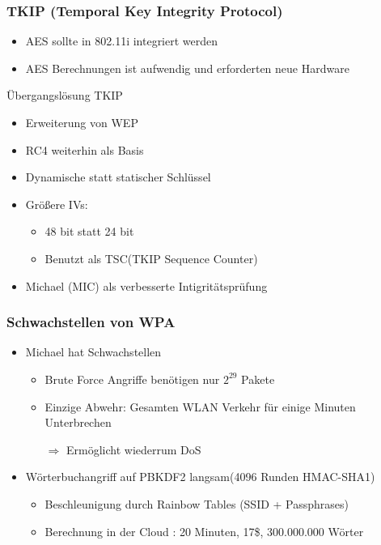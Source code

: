 \documentclass{beamer}
\begin{document}
\begin{frame}
\frametitle{TKIP (Temporal Key Integrity Protocol)}
\begin{itemize}
	\item AES sollte in 802.11i integriert werden
	\item AES Berechnungen ist aufwendig und erforderten neue Hardware
\end{itemize}
\begin{block}{Übergangslösung TKIP}
	\begin{itemize}
		\item Erweiterung von WEP
		\item RC4 weiterhin als Basis
		\item Dynamische statt statischer Schlüssel
		\item Größere IVs:
		\begin{itemize}
			\item 48 bit statt 24 bit
			\item Benutzt als TSC(TKIP Sequence Counter)
		\end{itemize}
		\item Michael (MIC) als verbesserte Intigritätsprüfung
	\end{itemize}
\end{block}
\end{frame}

\begin{frame}
\frametitle{Schwachstellen von WPA}
\begin{itemize}
	\item Michael hat Schwachstellen
	\begin{itemize}
		\item Brute Force Angriffe benötigen nur $2^{29}$ Pakete
		\item Einzige Abwehr: Gesamten WLAN Verkehr für einige Minuten Unterbrechen
		\item[$\Rightarrow$] Ermöglicht wiederrum DoS
	\end{itemize}
	\item Wörterbuchangriff auf PBKDF2 langsam(4096 Runden HMAC-SHA1)
	\begin{itemize}
		\item Beschleunigung durch Rainbow Tables \cite{renderlab} (SSID + Passphrases)
		\item Berechnung in der Cloud \cite{cloudcracker}: 20 Minuten, 17\$, 300.000.000 Wörter
	\end{itemize}
\end{itemize}
\end{frame}
\end{document}
